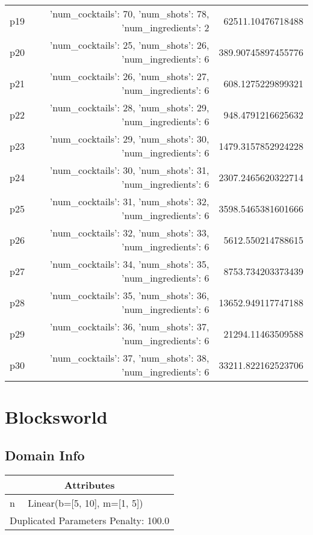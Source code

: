 \documentclass{article}
\begin{document}
\begin{center}
\begin{tabular}{r|r|r}
  p19&{'num\_cocktails': 70, 'num\_shots': 78, 'num\_ingredients': 2}&62511.10476718488\\
  p20&{'num\_cocktails': 25, 'num\_shots': 26, 'num\_ingredients': 6}&389.90745897455776\\
  p21&{'num\_cocktails': 26, 'num\_shots': 27, 'num\_ingredients': 6}&608.1275229899321\\
  p22&{'num\_cocktails': 28, 'num\_shots': 29, 'num\_ingredients': 6}&948.4791216625632\\
  p23&{'num\_cocktails': 29, 'num\_shots': 30, 'num\_ingredients': 6}&1479.3157852924228\\
  p24&{'num\_cocktails': 30, 'num\_shots': 31, 'num\_ingredients': 6}&2307.2465620322714\\
  p25&{'num\_cocktails': 31, 'num\_shots': 32, 'num\_ingredients': 6}&3598.5465381601666\\
  p26&{'num\_cocktails': 32, 'num\_shots': 33, 'num\_ingredients': 6}&5612.550214788615\\
  p27&{'num\_cocktails': 34, 'num\_shots': 35, 'num\_ingredients': 6}&8753.734203373439\\
  p28&{'num\_cocktails': 35, 'num\_shots': 36, 'num\_ingredients': 6}&13652.949117747188\\
  p29&{'num\_cocktails': 36, 'num\_shots': 37, 'num\_ingredients': 6}&21294.11463509588\\
  p30&{'num\_cocktails': 37, 'num\_shots': 38, 'num\_ingredients': 6}&33211.822162523706
                            \end{tabular}
                            \end{center}
                    
                            \newpage \section{Blocksworld}
                    \subsection*{Domain Info}

                    \begin{center}
                    \begin{tabular}{p{}p{}}
                    \multicolumn{2}{c}{\bf \large Attributes}\\\midrule
                    n & Linear(b=[5, 10], m=[1, 5])
                    
                     \\\midrule
                    \multicolumn{2}{l}{Duplicated Parameters Penalty: 100.0}
                    \end{tabular}
                    \end{center}
                
\end{document}
